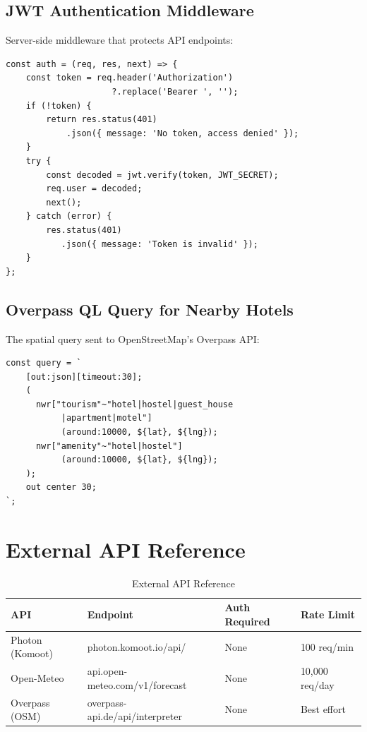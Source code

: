 \subsection{JWT Authentication Middleware}
Server-side middleware that protects API endpoints:
\begin{lstlisting}[style=csharpstyle]
const auth = (req, res, next) => {
    const token = req.header('Authorization')
                     ?.replace('Bearer ', '');
    if (!token) {
        return res.status(401)
            .json({ message: 'No token, access denied' });
    }
    try {
        const decoded = jwt.verify(token, JWT_SECRET);
        req.user = decoded;
        next();
    } catch (error) {
        res.status(401)
           .json({ message: 'Token is invalid' });
    }
};
\end{lstlisting}

\subsection{Overpass QL Query for Nearby Hotels}
The spatial query sent to OpenStreetMap's Overpass API:
\begin{lstlisting}[style=csharpstyle]
const query = `
    [out:json][timeout:30];
    (
      nwr["tourism"~"hotel|hostel|guest_house
           |apartment|motel"]
           (around:10000, ${lat}, ${lng});
      nwr["amenity"~"hotel|hostel"]
           (around:10000, ${lat}, ${lng});
    );
    out center 30;
`;
\end{lstlisting}

\section{External API Reference}
\begin{table}[H]
    \centering
    \renewcommand{\arraystretch}{1.4}
    \small
    \begin{tabular}{|p{2.5cm}|p{4cm}|p{3cm}|p{3cm}|}
        \hline
        \textbf{API} & \textbf{Endpoint} & \textbf{Auth Required} & \textbf{Rate Limit} \\
        \hline
        Photon (Komoot) & photon.komoot.io/api/ & None & 100 req/min \\
        \hline
        Open-Meteo & api.open-meteo.com/v1/forecast & None & 10,000 req/day \\
        \hline
        Overpass (OSM) & overpass-api.de/api/interpreter & None & Best effort \\
        \hline
    \end{tabular}
    \caption{External API Reference}
    \label{tab:api_ref}
\end{table}

